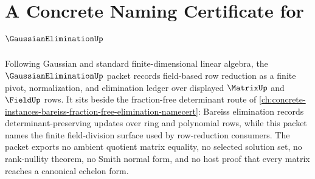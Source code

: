 \chapter{A Concrete Naming Certificate for $\GaussianEliminationUp$}
\label{ch:concrete-instances-gaussian-elimination-namecert}

Following Gaussian and standard finite-dimensional linear algebra, the $\GaussianEliminationUp$ packet records field-based row reduction as a finite pivot, normalization, and elimination ledger over displayed $\MatrixUp$ and $\FieldUp$ rows. It sits beside the fraction-free determinant route of \autoref{ch:concrete-instances-bareiss-fraction-free-elimination-namecert}: Bareiss elimination records determinant-preserving updates over ring and polynomial rows, while this packet names the finite field-division surface used by row-reduction consumers. The packet exports no ambient quotient matrix equality, no selected solution set, no rank-nullity theorem, no Smith normal form, and no host proof that every matrix reaches a canonical echelon form.

